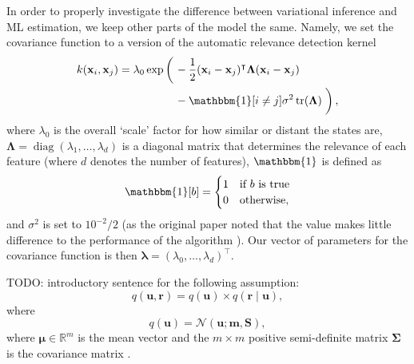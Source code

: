 \documentclass{mpaper}
\DeclareMathOperator{\diag}{diag}
\DeclareMathOperator{\tr}{tr}
\newcommand{\approximation}{q(\mathbf{u}, \mathbf{r})}
\begin{document}
In order to properly investigate the difference between variational inference
and ML estimation, we keep other parts of the model the same.
Namely, we set the covariance function to a version of the automatic relevance
detection kernel \cite{DBLP:conf/nips/LevinePK11,neal2012bayesian}
\begin{align*}
  k(\mathbf{x}_i, \mathbf{x}_j) = \lambda_0\exp\left( \vphantom{\frac{1}{2}} \right. &-\frac{1}{2}(\mathbf{x}_i - \mathbf{x}_j)^\intercal\bm\Lambda(\mathbf{x}_i - \mathbf{x}_j) \\
                                                     &- \mathbbm{1}[i \ne j]\sigma^2\tr(\bm\Lambda) \left. \vphantom{\frac{1}{2}} \right),
\end{align*}
where $\lambda_0$ is the overall `scale' factor for how similar or distant the
states are, $\bm\Lambda = \diag(\lambda_1, \dots, \lambda_d)$ is a diagonal
matrix that determines the relevance of each feature (where $d$ denotes the
number of features), $\mathbbm{1}$ is defined as
\[ \mathbbm{1}[b] = \begin{cases}
    1 & \mbox{if $b$ is true} \\
    0 & \mbox{otherwise},
  \end{cases} \]
and $\sigma^2$ is set to $10^{-2}/2$ (as the original paper noted that
the value makes little difference to the performance of the algorithm
\cite{DBLP:conf/nips/LevinePK11}). Our vector of parameters for the
covariance function is then $\bm\lambda = (\lambda_0, \dots,
\lambda_d)^\intercal$. %

TODO: introductory sentence for the following assumption:
\begin{equation} \label{eq:approximation}
  \approximation = q(\mathbf{u}) \times q(\mathbf{r} \mid \mathbf{u}),
\end{equation}
where
\begin{equation}
  q(\mathbf{u}) = \mathcal{N}(\mathbf{u}; \mathbf{m}, \mathbf{S}),
\end{equation}
where $\bm\mu \in \mathbb{R}^{m}$ is the mean vector and the $m \times m$
positive semi-definite matrix $\bm\Sigma$ is the covariance matrix
\cite{DBLP:conf/nips/ChengB17,DBLP:journals/jmlr/HensmanDS17,DBLP:conf/aaai/HoangHL17}.

  \begin{figure}
    \centering
    \label{fig:graphical_model}
  \end{figure}
\end{document}
